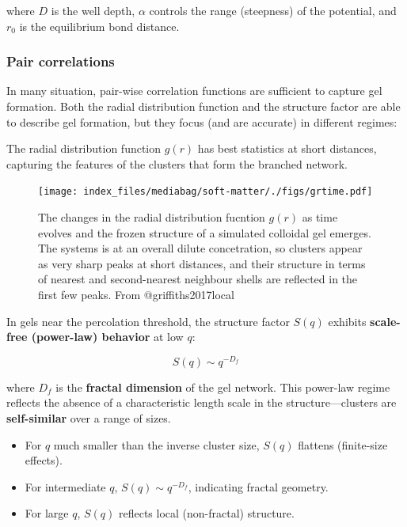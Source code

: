 \documentclass[
  letterpaper,
  enabledeprecatedfontcommands]{report}
\providecommand{\tightlist}{%
  \setlength{\itemsep}{0pt}\setlength{\parskip}{0pt}}
\begin{document}
where \(D\) is the well depth, \(\alpha\) controls the range (steepness)
of the potential, and \(r_0\) is the equilibrium bond distance.

\subsubsection*{Pair correlations}\label{pair-correlations}

In many situation, pair-wise correlation functions are sufficient to
capture gel formation. Both the radial distribution function and the
structure factor are able to describe gel formation, but they focus (and
are accurate) in different regimes:

The radial distribution function \(g(r)\) has best statistics at short
distances, capturing the features of the clusters that form the branched
network.

\begin{figure}[H]

{\centering \texttt{[image: index\_files/mediabag/soft-matter/./figs/grtime.pdf]}

}

\caption{The changes in the radial distribution fucntion \(g(r)\) as
time evolves and the frozen structure of a simulated colloidal gel
emerges. The systems is at an overall dilute concetration, so clusters
appear as very sharp peaks at short distances, and their structure in
terms of nearest and second-nearest neighbour shells are reflected in
the first few peaks. From @griffiths2017local}

\end{figure}%

In gels near the percolation threshold, the structure factor \(S(q)\)
exhibits \textbf{scale-free (power-law) behavior} at low \(q\):

\[
S(q) \sim q^{-D_f}
\]

where \(D_f\) is the \textbf{fractal dimension} of the gel network. This
power-law regime reflects the absence of a characteristic length scale
in the structure---clusters are \textbf{self-similar} over a range of
sizes.

\begin{itemize}
\tightlist
\item
  For \(q\) much smaller than the inverse cluster size, \(S(q)\)
  flattens (finite-size effects).
\item
  For intermediate \(q\), \(S(q) \sim q^{-D_f}\), indicating fractal
  geometry.
\item
  For large \(q\), \(S(q)\) reflects local (non-fractal) structure.
\end{itemize}
\end{document}
